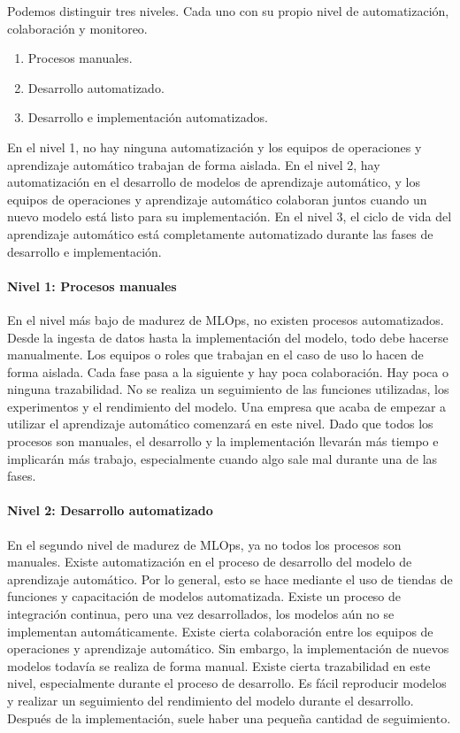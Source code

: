 \documentclass[10pt]{book}
\begin{document}
Podemos distinguir tres niveles. Cada uno con su propio nivel de automatización, colaboración y monitoreo.
\begin{enumerate}
	\item Procesos manuales.
	\item Desarrollo automatizado.
	\item Desarrollo e implementación automatizados.
\end{enumerate}
En el nivel 1, no hay ninguna automatización y los equipos de operaciones y aprendizaje automático trabajan de forma aislada. En el nivel 2, hay automatización en el desarrollo de modelos de aprendizaje automático, y los equipos de operaciones y aprendizaje automático colaboran juntos cuando un nuevo modelo está listo para su implementación. En el nivel 3, el ciclo de vida del aprendizaje automático está completamente automatizado durante las fases de desarrollo e implementación.

\paragraph{Nivel 1: Procesos manuales}
En el nivel más bajo de madurez de MLOps, no existen procesos automatizados. Desde la ingesta de datos hasta la implementación del modelo, todo debe hacerse manualmente. Los equipos o roles que trabajan en el caso de uso lo hacen de forma aislada. Cada fase pasa a la siguiente y hay poca colaboración. Hay poca o ninguna trazabilidad. No se realiza un seguimiento de las funciones utilizadas, los experimentos y el rendimiento del modelo. Una empresa que acaba de empezar a utilizar el aprendizaje automático comenzará en este nivel. Dado que todos los procesos son manuales, el desarrollo y la implementación llevarán más tiempo e implicarán más trabajo, especialmente cuando algo sale mal durante una de las fases.

\paragraph{Nivel 2: Desarrollo automatizado}
En el segundo nivel de madurez de MLOps, ya no todos los procesos son manuales. Existe automatización en el proceso de desarrollo del modelo de aprendizaje automático. Por lo general, esto se hace mediante el uso de tiendas de funciones y capacitación de modelos automatizada. Existe un proceso de integración continua, pero una vez desarrollados, los modelos aún no se implementan automáticamente. Existe cierta colaboración entre los equipos de operaciones y aprendizaje automático. Sin embargo, la implementación de nuevos modelos todavía se realiza de forma manual. Existe cierta trazabilidad en este nivel, especialmente durante el proceso de desarrollo. Es fácil reproducir modelos y realizar un seguimiento del rendimiento del modelo durante el desarrollo. Después de la implementación, suele haber una pequeña cantidad de seguimiento.
\end{document}
